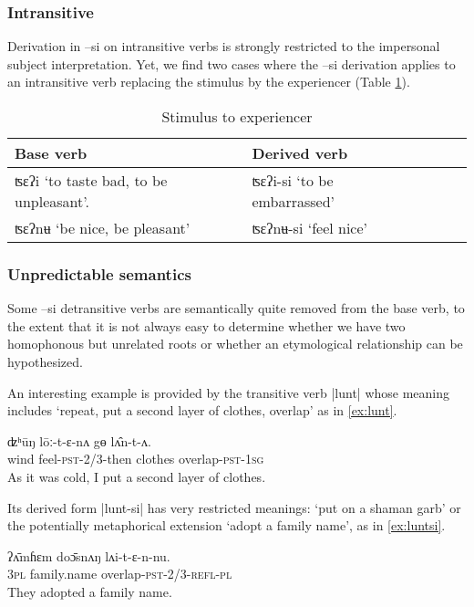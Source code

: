 \documentclass[twoside,a4paper,11pt]{article}
\newcommand{\ipa}[1]{{\phon#1}}
\begin{document}
\subsubsection{Intransitive} 
Derivation in \ipa{--si}  on intransitive verbs is strongly restricted to the impersonal subject interpretation. Yet, we find two cases where the \ipa{--si} derivation applies to an intransitive verb replacing the stimulus by the experiencer (Table \ref{tab:stimulus}).

\begin{table}[H]
 \centering 
\caption{Stimulus to experiencer  } \label{tab:stimulus}
\begin{tabular}{lllll}
\toprule
Base verb & Derived verb \\
\midrule
\ipa{ʦɛʔi} `to taste bad, to be unpleasant'.    & \ipa{ʦɛʔi-si} `to be embarrassed'  \\
\ipa{ʦɛʔnʉ} `be nice, be pleasant' &   \ipa{ʦɛʔnʉ-si} `feel nice' \\
\bottomrule
\end{tabular}
\end{table}
 
\subsubsection{Unpredictable semantics}

Some \ipa{--si} detransitive verbs are semantically quite removed from the base verb, to the extent that it is not always easy to determine whether we have two homophonous but unrelated roots or whether an etymological relationship can be hypothesized.

An interesting example is provided by the transitive verb |\ipa{lunt}| whose meaning includes `repeat, put a second layer of clothes, overlap' as in \ref{ex:lunt}.
\begin{exe}
\ex \label{ex:lunt}
\gll 
\ipa{ʣʰūŋ}  	\ipa{lōː-t-ɛ-nʌ}  	\ipa{gɵ}  	\ipa{lʌ̂n-t-ʌ.}  \\
wind feel-\textsc{pst-2/3}-then clothes overlap-\textsc{pst-1sg} \\ 
\glt As it was cold, I put a second layer of clothes.
\end{exe}

Its derived form |\ipa{lunt-si}| has very restricted meanings: `put on a shaman garb' or the potentially metaphorical extension `adopt a family name', as in \ref{ex:luntsi}.

\begin{exe}
\ex \label{ex:luntsi}
\gll 
\ipa{ʔʌ̄mɦɛm}  	\ipa{doɔ̄snʌŋ}  	\ipa{lʌi-t-ɛ-n-nu.}  \\
\textsc{3pl} family.name overlap-\textsc{pst-2/3-refl-pl} \\
\glt They adopted a family name.
\end{exe}
\end{document}
